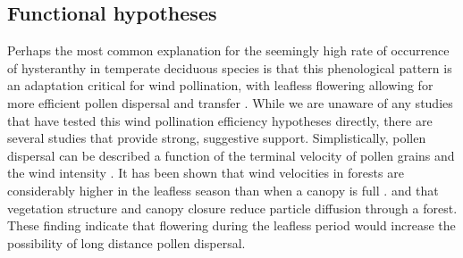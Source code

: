 \documentclass{article}\usepackage[]{graphicx}\usepackage[]{color}
\begin{document}
\subsection*{Functional hypotheses}
\indent Perhaps the most common explanation for the seemingly high rate of occurrence of hysteranthy in temperate deciduous species is that this phenological pattern is an adaptation critical for wind pollination, with leafless flowering allowing for more efficient pollen dispersal and transfer \citep{Whitehead1969,Rathcke1985, Barnes}. While we are unaware of any studies that have tested this wind pollination efficiency hypotheses directly, there are several studies that provide strong, suggestive support. Simplistically, pollen dispersal can be described a function of the terminal velocity of pollen grains and the wind intensity \citep{Niklas1985,Whitehead1969}. It has been shown that wind velocities in forests are considerably higher in the leafless season than when a canopy is full \citep{Brown1993,Whitehead1969}. and that vegetation structure and canopy closure reduce particle diffusion through a forest\citep{Brown1993}. These finding indicate that flowering during the leafless period would increase the possibility of long distance pollen dispersal.\\
\end{document}
